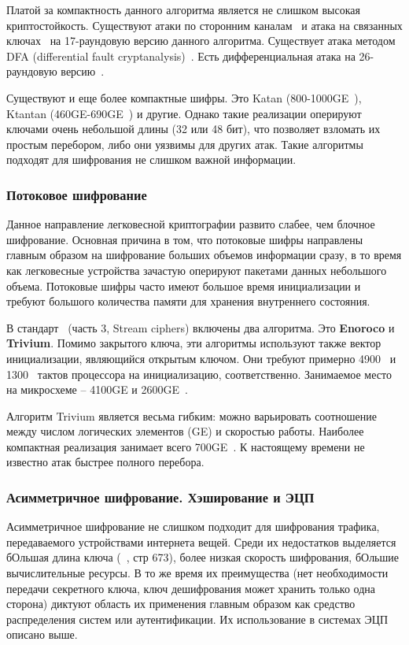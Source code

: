 Платой за компактность данного алгоритма является не слишком высокая криптостойкость. Существуют атаки по сторонним каналам~\cite{src40,src41} и атака на связанных ключах~\cite{src42} на 17-раундовую версию данного алгоритма. Существует атака методом DFA (differential fault cryptanalysis)~\cite{src43}. Есть дифференциальная атака на 26-раундовую версию~\cite{src44}.

Существуют и еще более компактные шифры. Это Katan (800-1000GE~\cite{src45}), Ktantan (460GE-690GE~\cite{src45}) и другие. Однако такие реализации оперируют ключами очень небольшой длины (32 или 48 бит), что позволяет взломать их простым перебором, либо они уязвимы для других атак. Такие алгоритмы подходят для шифрования не слишком важной информации.

\subsubsection{Потоковое шифрование}

Данное направление легковесной криптографии развито слабее, чем блочное шифрование. Основная причина в том, что потоковые шифры направлены главным образом на шифрование больших объемов информации сразу, в то время как легковесные устройства зачастую оперируют пакетами данных небольшого объема. Потоковые шифры часто имеют большое время инициализации и требуют большого количества памяти для хранения внутреннего состояния.

В стандарт~\cite{src26} (часть 3, Stream ciphers) включены два алгоритма. Это \textbf{Enoroco} и \textbf{Trivium}. Помимо закрытого ключа, эти алгоритмы используют также вектор инициализации, являющийся открытым ключом. Они требуют примерно 4900~\cite{src46} и 1300~\cite{src47} тактов процессора на инициализацию, соответственно. Занимаемое место на микросхеме – 4100GE и 2600GE~\cite{src48}.

Алгоритм Trivium является весьма гибким: можно варьировать соотношение между числом логических элементов (GE) и скоростью работы. Наиболее компактная реализация занимает всего 700GE~\cite{src49}. К настоящему времени не известно атак быстрее полного перебора.

\subsubsection{Асимметричное шифрование. Хэширование и ЭЦП}

Асимметричное шифрование не слишком подходит для шифрования трафика, передаваемого устройствами интернета вещей. Среди их недостатков выделяется бОльшая длина ключа (~\cite{src50}, стр 673), более низкая скорость шифрования, бОльшие вычислительные ресурсы. В то же время их преимущества (нет необходимости передачи секретного ключа, ключ дешифрования может хранить только одна сторона) диктуют область их применения главным образом как средство распределения систем или аутентификации. Их использование в системах ЭЦП описано выше.

